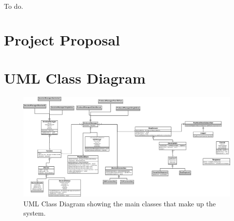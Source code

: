 To do.

\cleardoublepage



\cleardoublepage

\appendix

\chapter{Project Proposal}

%

\chapter{UML Class Diagram}

\begin{figure}
\centering
\includegraphics[angle = 90, scale=0.17]{UMLClassDiagram}
\caption{UML Class Diagram showing the main classes that make up the system.}
\label{fig:uml}
\end{figure}


